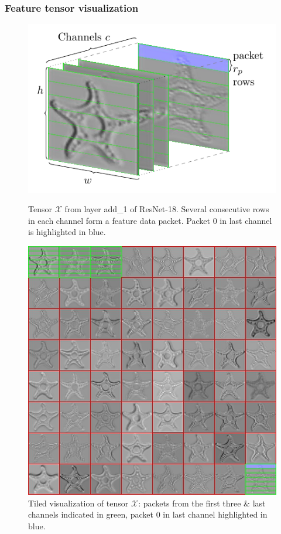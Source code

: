 \documentclass[aspectratio=169]{beamer}
\begin{document}
\begin{frame}
	\frametitle{Feature tensor visualization}
	\begin{figure}
		\begin{minipage}{.48\textwidth}
		\centering
			\includegraphics[width=\linewidth]{tensorlostviz3vcipprez.pdf}
			\caption{Tensor $\mathcal{X}$ from layer add\_1 of ResNet-18. Several consecutive rows in each channel form a feature data packet. Packet 0 in last channel is highlighted in blue.}
		\end{minipage}\hfill
		\begin{minipage}{.48\textwidth}
		\centering
			\includegraphics[width=0.78\linewidth]{original_batch_2_item_0_tiled_gridded.jpg}
			\caption{Tiled visualization of tensor $\mathcal{X}$: packets from the first three \& last channels indicated in green, packet 0 in last channel highlighted in blue.}
		\end{minipage}
	\end{figure}
\end{frame}
\end{document}
